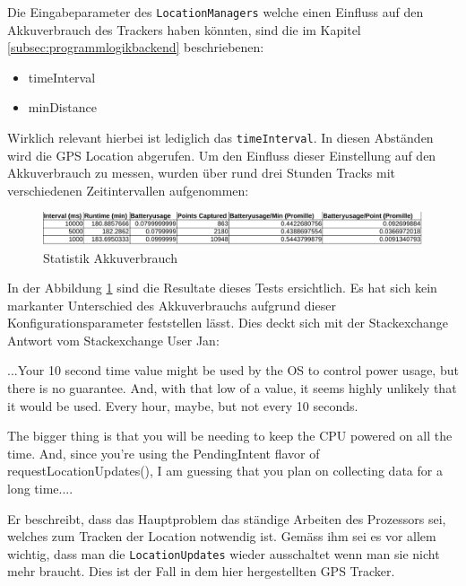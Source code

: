 Die Eingabeparameter des \lstinline$LocationManagers$ welche einen Einfluss auf den Akkuverbrauch des Trackers haben könnten, sind die im Kapitel \ref{subsec:programmlogikbackend} beschriebenen:
\begin{itemize}
	\item timeInterval
	\item minDistance
\end{itemize}

Wirklich relevant hierbei ist lediglich das \lstinline$timeInterval$. In diesen Abständen wird die GPS Location abgerufen. Um den Einfluss dieser Einstellung auf den Akkuverbrauch zu messen, wurden über rund drei Stunden Tracks mit verschiedenen Zeitintervallen aufgenommen:

\begin{figure}[h]
  \centering
  \includegraphics[width=\textwidth]{images/batteryusage.pdf}
  \caption[Statistik Akkuverbrauch]{Statistik Akkuverbrauch}
  \label{fig:batteryusage}
\end{figure}

In der Abbildung \ref{fig:batteryusage} sind die Resultate dieses Tests ersichtlich. Es hat sich kein markanter Unterschied des Akkuverbrauchs aufgrund dieser Konfigurationsparameter feststellen lässt. Dies deckt sich mit der Stackexchange Antwort vom Stackexchange User Jan:

\flqq ...Your 10 second time value might be used by the OS to control power usage, but there is no guarantee. And, with that low of a value, it seems highly unlikely that it would be used. Every hour, maybe, but not every 10 seconds.

The bigger thing is that you will be needing to keep the CPU powered on all the time. And, since you're using the PendingIntent flavor of requestLocationUpdates(), I am guessing that you plan on collecting data for a long time....\frqq \cite{batteryusage}

Er beschreibt, dass das Hauptproblem das ständige Arbeiten des Prozessors sei, welches zum Tracken der Location notwendig ist. Gemäss ihm sei es vor allem wichtig, dass man die \lstinline$LocationUpdates$ wieder ausschaltet wenn man sie nicht mehr braucht. Dies ist der Fall in dem hier hergestellten GPS Tracker.